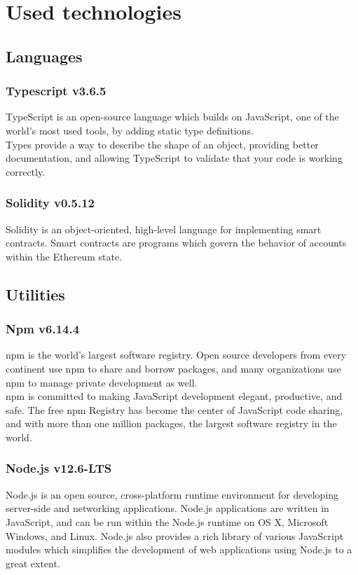 \section{Used technologies}

\subsection{Languages}
\subsubsection{Typescript v3.6.5}
TypeScript is an open-source language which builds on JavaScript, one of the world’s most used tools, by adding static type definitions.\\
Types provide a way to describe the shape of an object, providing better documentation, and allowing TypeScript to validate that your code is working correctly.

\subsubsection{Solidity v0.5.12}
Solidity is an object-oriented, high-level language for implementing smart contracts.
Smart contracts are programs which govern the behavior of accounts within the Ethereum state.

\subsection{Utilities}

\subsubsection{Npm v6.14.4}
npm is the world’s largest software registry. Open source developers from every continent use npm to share and borrow packages, and many organizations use npm to manage private development as well.\\
npm is committed to making JavaScript development elegant, productive, and safe. The free npm Registry has become the center of JavaScript code sharing, and with more than one million packages, the largest software registry in the world. 

\subsubsection{Node.js v12.6-LTS}
Node.js is an open source, cross-platform runtime environment for developing server-side and networking applications. 
Node.js applications are written in JavaScript, and can be run within the Node.js runtime on OS X, Microsoft Windows, and Linux.
Node.js also provides a rich library of various JavaScript modules which simplifies the development of web applications using Node.js to a great extent.

